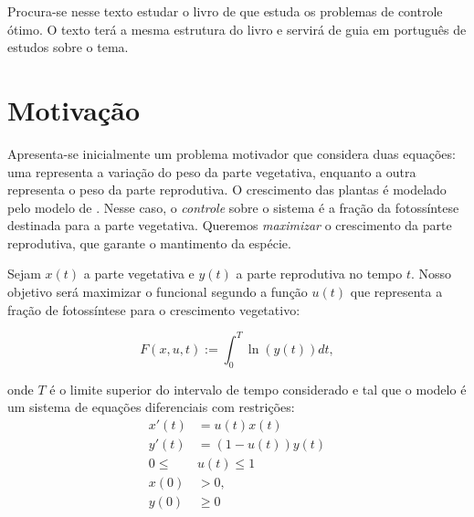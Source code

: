 Procura-se nesse texto estudar o livro de \cite{lenhart2007} que estuda os
problemas de controle ótimo. O texto terá a mesma estrutura do livro e servirá
de guia em português de estudos sobre o tema. 

\section{Motivação}
    Apresenta-se inicialmente um problema motivador que considera duas equações: uma
    representa a variação do peso da parte vegetativa, enquanto a outra representa
    o peso da parte reprodutiva. O crescimento das plantas é modelado pelo modelo
    de \cite{cohen1971299}. Nesse caso, o \textit{controle} sobre o sistema é a fração
    da fotossíntese destinada para a parte vegetativa. Queremos \textit{maximizar} o 
    crescimento da parte reprodutiva, que garante o mantimento da espécie. 

    Sejam $x(t)$ a parte vegetativa e $y(t)$ a parte reprodutiva no
    tempo $t$. Nosso objetivo será maximizar o funcional 
    segundo a função $u(t)$ que representa a fração de fotossíntese para
    o crescimento vegetativo: 

    \begin{equation}
        \label{funcional-maximize}
        F(x,u,t) := \int_0^T \ln(y(t))dt, 
    \end{equation}

    onde $T$ é o limite superior do intervalo de tempo considerado e tal que o
    modelo é um sistema de equações diferenciais com restrições: 
    \begin{align*}
        x'(t) &= u(t)x(t) \\
        y'(t) &= (1 - u(t))y(t) \\
        0 \leq &u(t) \leq 1 \\
        x(0) &> 0, \\
        y(0) &\geq 0
    \end{align*}    

